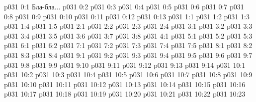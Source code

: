 \author{Божественный Советник и Не Имеющий Имени и Номера}
\vs p031 0:1  Бла-бла...
\vs p031 0:2 
\vs p031 0:3 
\vs p031 0:4 
\vs p031 0:5 
\vs p031 0:6 
\vs p031 0:7 
\vs p031 0:8 \pc 
\vs p031 0:9 
\vs p031 0:10 
\vs p031 0:11 
\vs p031 0:12 
\vs p031 0:13 
\vs p031 1:1 
\vs p031 1:2 
\vs p031 1:3 
\vs p031 1:4 
\vs p031 1:5 
\vs p031 2:1 
\vs p031 2:2 \pc 
\vs p031 2:3 \pc 
\vs p031 2:4 
\vs p031 3:1 
\vs p031 3:2 
\vs p031 3:3 \pc 
\vs p031 3:4 
\vs p031 3:5 
\vs p031 3:6 
\vs p031 3:7 
\vs p031 3:8 \pc 
{}
\vs p031 4:1 
\vs p031 5:1 
\vs p031 5:2 
\vs p031 5:3 
\vs p031 6:1 
\vs p031 6:2 
\vs p031 7:1 
\vs p031 7:2 
\vs p031 7:3 \pc 
\vs p031 7:4 
\vs p031 7:5 
\vs p031 8:1 
\vs p031 8:2 
\vs p031 8:3 
\vs p031 8:4 
\vs p031 9:1 
\vs p031 9:2 
\vs p031 9:3 
\vs p031 9:4 
\vs p031 9:5 
\vs p031 9:6 
\vs p031 9:7 
\vs p031 9:8 
\vs p031 9:9 
\vs p031 9:10 \pc 
\vs p031 9:11 \pc 
\vs p031 9:12 
\vs p031 9:13 
\vs p031 9:14 
\vs p031 10:1 
\vs p031 10:2 
\vs p031 10:3 
\vs p031 10:4 
\vs p031 10:5 
\vs p031 10:6 
\vs p031 10:7 
\vs p031 10:8 
\vs p031 10:9 
\vs p031 10:10 
\vs p031 10:11 
\vs p031 10:12 
\vs p031 10:13 
\vs p031 10:14 
\vs p031 10:15 
\vs p031 10:16 
\vs p031 10:17 
\vs p031 10:18 
\vs p031 10:19 \pc 
\vs p031 10:20 \pc 
\vsetoff
\vs p031 10:21 
\vs p031 10:22 
\vs p031 10:23 
\quizlink
